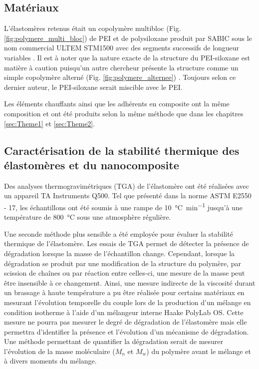 \subsection{Matériaux}

L'élastomères retenus était un copolymère multibloc (Fig. \ref{fig:polymere_multi_bloc}) de PEI et de polysiloxane  produit par SABIC sous le nom commercial ULTEM STM1500 avec des segments successifs de longueur variables  \cite{mark2013,Holden2002}. 
Il est à noter que la nature exacte de la structure du PEI-siloxane est matière à caution puisqu'un autre chercheur présente la structure comme un simple copolymère alterné (Fig. \ref{fig:polymere_alternee}) \cite{Hatui2015}. 
Toujours selon ce dernier auteur, le PEI-siloxane serait miscible avec le PEI. 

Les éléments chauffants ainsi que les adhérents en composite ont la même composition et ont été produits selon la même méthode que dans les chapitres \ref{sec:Theme1} et \ref{sec:Theme2}. 

\subsection{Caractérisation de la stabilité thermique des élastomères et du nanocomposite}

Des analyses thermogravimétriques (TGA) de l'élastomère ont été réalisées avec un appareil TA Instruments Q500. 
Tel que présenté dans la norme ASTM E2550 - 17, les échantillons ont été soumis à une rampe de \SI[locale=FR]{10}{\celsius\per\minute} jusqu'à une température de \SI[locale=FR]{800}{\celsius} sous une atmosphère régulière. 

Une seconde méthode plus sensible a été employée pour évaluer la stabilité thermique de l'élastomère. 
Les essais de TGA permet de détecter la présence de dégradation lorsque la masse de l'échantillon change. 
Cependant, lorsque la dégradation se produit par une modification de la structure du polymère, par scission de chaînes ou par réaction entre celles-ci, une mesure de la masse peut être insensible à ce changement. 
Ainsi, une mesure indirecte de la viscosité durant un brassage à haute température a pu être réalisée pour certains matériaux en mesurant l'évolution temporelle du couple lors de la production d'un mélange en condition isotherme à l'aide d'un mélangeur interne Haake PolyLab OS. 
Cette mesure ne pourra pas mesurer le degré de dégradation de l'élastomère mais elle permettra d'identifier la présence et l'évolution d'un mécanisme de dégradation. 
Une méthode permettant de quantifier la dégradation serait de mesurer l'évolution de la masse moléculaire ($M_n$ et $M_w$) du polymère avant le mélange et à divers moments du mélange. 

